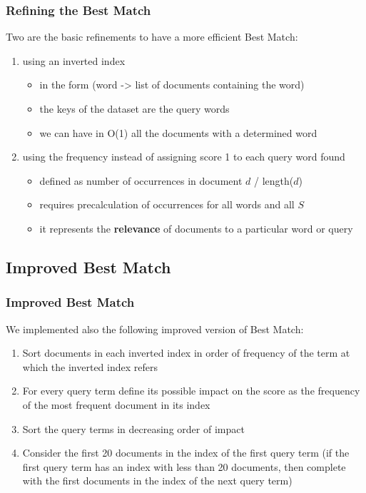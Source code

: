 \documentclass{beamer}
\begin{document}
\begin{frame}
\frametitle{Refining the Best Match}
Two are the basic refinements to have a more efficient Best Match:
\begin{enumerate}
	\item using an inverted index
	\begin{itemize}
		\item in the form (word -> list of documents containing the word)
		\item the keys of the dataset are the query words
		\item we can have in O(1) all the documents with a determined word  
	\end{itemize}
	\item using the frequency instead of assigning score 1 to each query word found
	\begin{itemize}
		\item defined as number of occurrences in document $d$ / length($d$)
		\item requires precalculation of occurrences for all words and all $S$
		\item it represents the \textbf{relevance} of documents to a particular word or query
	\end{itemize}	
\end{enumerate}
\end{frame}

\subsection{Improved Best Match}
\newcommand{\asuivre}{\setcounter{sauvegardeenumi}{\theenumi}}
\newcommand{\suite}{\setcounter{enumi}{\thesauvegardeenumi}}

\begin{frame}
\frametitle{Improved Best Match}
We implemented also the following improved version of Best Match:
\begin{enumerate}
	\item Sort documents in each inverted index in order of frequency of the term at which the inverted index refers
	\item For every query term define its possible impact on the score as the frequency of the most frequent document in its index
	\item Sort the query terms in decreasing order of impact
	\item Consider the first 20 documents in the index of the first query term (if the first query term has an index with less than 20 documents, then complete with the first documents in the index of the next query term)
	\asuivre
\end{enumerate}
\end{frame}
\end{document}
